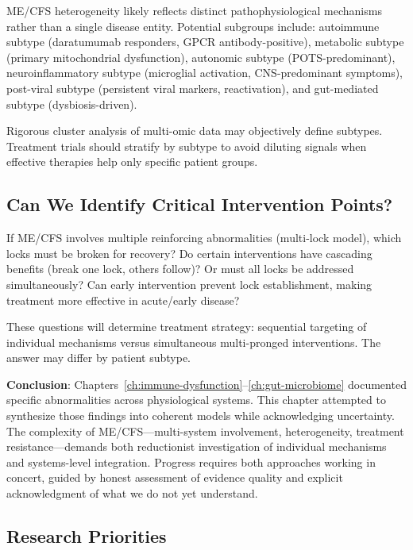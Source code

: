 ME/CFS heterogeneity likely reflects distinct pathophysiological mechanisms rather than a single disease entity. Potential subgroups include: autoimmune subtype (daratumumab responders, GPCR antibody-positive), metabolic subtype (primary mitochondrial dysfunction), autonomic subtype (POTS-predominant), neuroinflammatory subtype (microglial activation, CNS-predominant symptoms), post-viral subtype (persistent viral markers, reactivation), and gut-mediated subtype (dysbiosis-driven).

Rigorous cluster analysis of multi-omic data may objectively define subtypes. Treatment trials should stratify by subtype to avoid diluting signals when effective therapies help only specific patient groups.

\subsection{Can We Identify Critical Intervention Points?}

If ME/CFS involves multiple reinforcing abnormalities (multi-lock model), which locks must be broken for recovery? Do certain interventions have cascading benefits (break one lock, others follow)? Or must all locks be addressed simultaneously? Can early intervention prevent lock establishment, making treatment more effective in acute/early disease?

These questions will determine treatment strategy: sequential targeting of individual mechanisms versus simultaneous multi-pronged interventions. The answer may differ by patient subtype.

\vspace{1em}

\noindent\textbf{Conclusion}: Chapters~\ref{ch:immune-dysfunction}--\ref{ch:gut-microbiome} documented specific abnormalities across physiological systems. This chapter attempted to synthesize those findings into coherent models while acknowledging uncertainty. The complexity of ME/CFS---multi-system involvement, heterogeneity, treatment resistance---demands both reductionist investigation of individual mechanisms and systems-level integration. Progress requires both approaches working in concert, guided by honest assessment of evidence quality and explicit acknowledgment of what we do not yet understand.

\subsection{Research Priorities}

